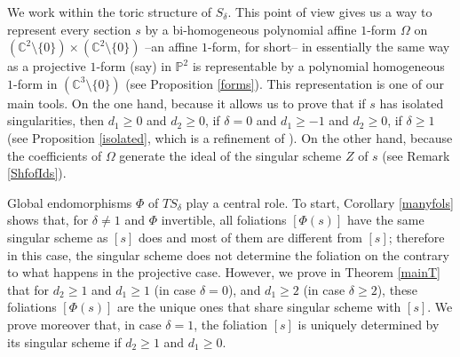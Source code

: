 \documentclass{amsart} %
\theoremstyle{definition}
\newcommand{\cs}{S_{\delta}}
\newcommand{\PP}{\mathbb{P}}
\newcommand{\mcL}{\mathcal{L}}
\newcommand{\mcO}{\mathcal{O}}
\begin{document}
We work within the toric structure of $ \cs $. This point of view gives us a way to represent
every section $ s $ by a bi-homogeneous polynomial affine $1$-form $ \Omega $ on
$(\mathbb{C}^2\setminus \{0\})\times (\mathbb{C}^2\setminus \{0\})$ --an affine $1$-form, for
short-- in essentially the same way as a projective $1$-form (say) in $ \PP^2 $ is representable by a
polynomial homogeneous $1$-form in
$(\mathbb{C}^3\setminus \{0\}) $ (see Proposition \ref{forms}).
This representation is one of our main tools. On the one hand, because it allows us to prove that if
$ s $ has isolated singularities, then $ d_1 \geq 0 $ and $ d_2 \geq 0 $, if $ \delta = 0 $ and
$ d_1 \geq -1 $ and $ d_2 \geq 0 $, if $ \delta \geq 1 $
(see Proposition \ref{isolated}, which is a refinement of \cite[Proposition 2.2]{Gomez-Mont}). On the
other hand, because the coefficients of $ \Omega $ generate the ideal of the singular scheme $ Z $
of $ s $ (see Remark \ref{ShfofIds}).

Global endomorphisms $ \Phi $ of $ T\cs $ play a central role. To start, Corollary \ref{manyfols} shows that,
for $ \delta \neq 1 $ and $ \Phi $ invertible, all foliations $ [ \Phi( s ) ] $ have the same singular
scheme as $ [s] $ does and most of them are different from $ [s] $;
therefore in this case, the singular scheme
does not determine the foliation on the contrary to what happens in the projective case.
However, we prove in Theorem \ref{mainT} that for $ d_2 \geq 1 $
and $d_1 \geq 1$ (in case $\delta=0$), and $d_1 \geq 2$ (in case $\delta \geq 2$),
these foliations $ [ \Phi( s ) ] $ are the unique ones that
share singular scheme with $ [s] $. We prove moreover that, in case $ \delta = 1 $, the foliation $ [s] $
is uniquely determined by its singular scheme if $ d_2 \geq 1 $ and $ d_1 \geq 0 $.
\end{document}
